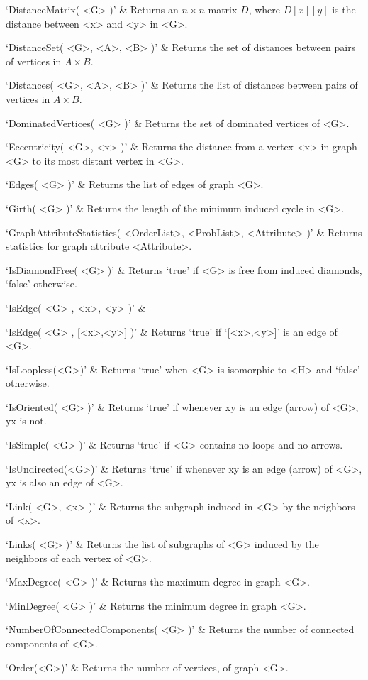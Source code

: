 `DistanceMatrix( <G> )' & 
Returns an $n\times n$ matrix $D$, where $D[x][y]$ is the distance between <x> and <y> in <G>.

`DistanceSet( <G>, <A>, <B> )' & 
Returns the set of distances between pairs of vertices in $A\times B$.

`Distances( <G>, <A>, <B> )' & 
Returns the list of distances between pairs of vertices in $A\times B$.

`DominatedVertices( <G> )' & 
Returns the set of dominated vertices of <G>.

`Eccentricity( <G>, <x> )' & 
Returns  the  distance  from a vertex <x> in graph <G> to its most distant vertex in <G>.

`Edges( <G> )' & 
Returns the list of edges of graph <G>.

`Girth( <G> )' &
Returns the length of the minimum induced cycle in <G>.

`GraphAttributeStatistics( <OrderList>, <ProbList>, <Attribute> )' &
Returns statistics for graph attribute <Attribute>. 

`IsDiamondFree( <G> )' & 
Returns `true' if <G> is free from induced diamonds, `false' otherwise.

`IsEdge( <G> , <x>, <y> )' & 

`IsEdge( <G> , [<x>,<y>] )' & 
Returns `true' if `[<x>,<y>]' is an edge of <G>.

`IsLoopless(<G>)' & 
Returns `true' when <G> is isomorphic to <H> and `false' otherwise.

`IsOriented( <G> )' & 
Returns `true' if whenever xy is an edge (arrow)  of <G>, yx is not.

`IsSimple( <G> )' & 
Returns `true' if <G> contains no loops and no arrows.

`IsUndirected(<G>)' & 
Returns `true' if whenever xy is an edge (arrow) of <G>, yx is also an edge of <G>.

`Link( <G>, <x> )' & 
Returns the subgraph induced in <G> by the neighbors of <x>.

`Links( <G> )' & 
Returns  the  list  of  subgraphs  of <G> induced by the neighbors of each vertex of <G>.

`MaxDegree( <G> )' & 
Returns the maximum degree in graph <G>.

`MinDegree( <G> )' & 
Returns the minimum degree in graph <G>.

`NumberOfConnectedComponents( <G> )' & 
Returns the number of connected components of <G>.

`Order(<G>)' & 
Returns the number of vertices, of graph <G>.

